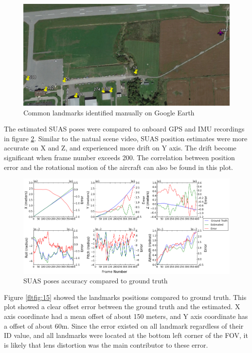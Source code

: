 \begin{figure}[h]
\centering
\includegraphics[width=13cm, keepaspectratio=true]
{./Figures/fltfig/airport/uav_and_identified_landmark.png}
\caption{Common landmarks identified manually on Google Earth }
\label{fltfig:12}
\end{figure}
\FloatBarrier The estimated SUAS poses were compared to onboard GPS
and IMU recordings in figure \ref{fltfig:13}. Similar to the natual
scene video, SUAS position estimates were more accurate on X and Z,
and experienced more drift on Y axis. The drift become significant
when frame number exceeds 200. The correlation between position error
and the rotational motion of the aircraft can also be found in this
plot.

\begin{figure}[h]
\centering
\includegraphics[width=17cm, keepaspectratio=true]
{./Figures/fltfig/airport/Figure10.png}
\caption{SUAS poses accuracy compared to ground truth}
\label{fltfig:13}
\end{figure}
\FloatBarrier

Figure \ref{fltfig:15} showed the landmarks positions compared to
ground truth. This plot showed a clear offset error between the ground
truth and the estimated. X axis coordinate had a mean offset of about
150 meters, and Y axis coordinate has a offset of about 60m. Since the
error existed on all landmark regardless of their ID value, and all
landmarks were located at the bottom left corner of the FOV, it is
likely that lens distortion was the main contributor to these error.


